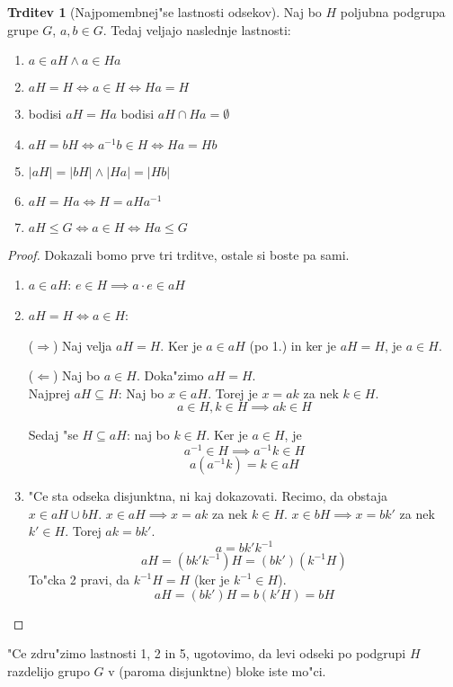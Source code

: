 \documentclass[11pt, a4paper]{article}
\theoremstyle{definition}
\newtheorem{claim}[counter]{Trditev}
\theoremstyle{remark}
\begin{document}
	\begin{claim}[Najpomembnej"se lastnosti odsekov]\label{lastnosti_odsekov}
		Naj bo $H$ poljubna podgrupa grupe $G$, $a,b \in G$. Tedaj veljajo naslednje lastnosti:
		\begin{enumerate}
			\item $a \in aH \land a \in Ha$
			\item $aH = H \iff a \in H \iff Ha = H$
			\item bodisi $aH = Ha$ bodisi $aH \cap Ha = \emptyset$
			\item $aH = bH \iff a^{-1}b \in H \iff Ha = Hb$
			\item $|aH| = |bH| \land |Ha| = |Hb|$
			\item $aH = Ha \iff H = aHa^{-1}$
			\item $aH \leq G \iff a \in H \iff Ha \leq G$
		\end{enumerate}
	\end{claim}
	\begin{proof}
		Dokazali bomo prve tri trditve, ostale si boste pa sami.\\
		\begin{enumerate}
			\item $a \in aH$: $e \in H \implies a\cdot e \in aH$
			\item $aH = H \iff a \in H$:
			
				($\Rightarrow$) Naj velja $aH = H$. Ker je $a \in aH$ (po 1.) in ker je $aH = H$, je $a \in H$.
				
				($\Leftarrow$) Naj bo $a \in H$. Doka"zimo $aH = H$. \\
				Najprej $aH \subseteq H$: Naj bo $x \in aH$. Torej je $x = ak$ za nek $k \in H$.
				\[ a \in H, k \in H \implies ak \in H \]
				
				Sedaj "se $H \subseteq aH$: naj bo $k \in H$. Ker je $a \in H$, je \[ a^{-1} \in H \implies a^{-1}k \in H \]
				\[a(a^{-1}k) = k \in aH \]
			\item "Ce sta odseka disjunktna, ni kaj dokazovati. Recimo, da obstaja $x \in aH \cup bH$. $x \in aH \implies x = ak$ za nek $k \in H$. $x \in bH \implies x = bk'$ za nek $k' \in H$. Torej $ak = bk'$.
			\[ a = bk'k^{-1} \]
			\[ aH = (bk'k^{-1})H = (bk')(k^{-1}H) \]
			To"cka 2 pravi, da $k^{-1}H = H$ (ker je $k^{-1} \in H$).
			\[ aH = (bk')H = b(k'H) = bH \]
		\end{enumerate}
	\end{proof}

	"Ce zdru"zimo lastnosti 1, 2 in 5, ugotovimo, da levi odseki po podgrupi $H$ razdelijo grupo $G$ v (paroma disjunktne) bloke iste mo"ci.
	
\end{document}
